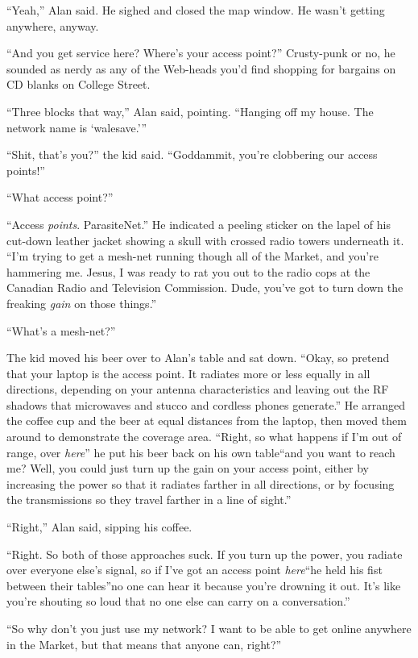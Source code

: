 ``Yeah,'' Alan said.  He sighed and closed the map window.  He wasn't
getting anywhere, anyway.

``And you get service here?  Where's your access point?'' Crusty-punk
or no, he sounded as nerdy as any of the Web-heads you'd find shopping
for bargains on CD blanks on College Street.

``Three blocks that way,'' Alan said, pointing.  ``Hanging off my
house.  The network name is `walesave.'''

``Shit, that's you?'' the kid said.  ``Goddammit, you're clobbering
our access points!''

``What access point?''

``Access \textit{points}.  ParasiteNet.'' He indicated a peeling
sticker on the lapel of his cut-down leather jacket showing a skull
with crossed radio towers underneath it.  ``I'm trying to get a
mesh-net running though all of the Market, and you're hammering me. 
Jesus, I was ready to rat you out to the radio cops at the Canadian
Radio and Television Commission.  Dude, you've got to turn down the
freaking \textit{gain} on those things.''

``What's a mesh-net?''

The kid moved his beer over to Alan's table and sat down.  ``Okay, so
pretend that your laptop is the access point.  It radiates more or
less equally in all directions, depending on your antenna
characteristics and leaving out the RF shadows that microwaves and
stucco and cordless phones generate.'' He arranged the coffee cup and
the beer at equal distances from the laptop, then moved them around to
demonstrate the coverage area.  ``Right, so what happens if I'm out of
range, over \textit{here}\dash{}'' he put his beer back on his own
table\dash{}``and you want to reach me?  Well, you could just turn up the
gain on your access point, either by increasing the power so that it
radiates farther in all directions, or by focusing the transmissions
so they travel farther in a line of sight.''

``Right,'' Alan said, sipping his coffee.

``Right.  So both of those approaches suck.  If you turn up the power,
you radiate over everyone else's signal, so if I've got an access
point \textit{here}``\dash{}he held his fist between their tables\dash{}''no one
can hear it because you're drowning it out.  It's like you're shouting
so loud that no one else can carry on a conversation.''

``So why don't you just use my network?  I want to be able to get
online anywhere in the Market, but that means that anyone can,
right?''

